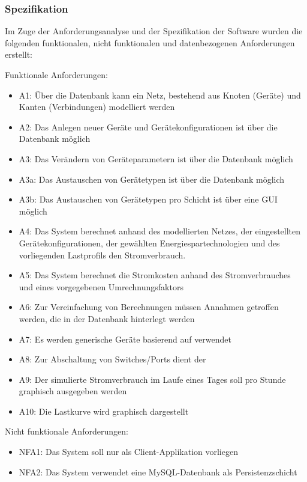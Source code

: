 \subsubsection{Spezifikation}
Im Zuge der Anforderungsanalyse und der Spezifikation der Software wurden die folgenden funktionalen, nicht funktionalen und datenbezogenen Anforderungen erstellt:



Funktionale Anforderungen:
\begin{itemize}
	\item A1: Über die Datenbank kann ein Netz, bestehend aus Knoten (Geräte) und Kanten (Verbindungen) modelliert werden
	\item A2: Das Anlegen neuer Geräte und Geräte\-konfi\-gura\-tionen ist über die Datenbank möglich
	\item A3: Das Verändern von Geräte\-parametern ist über die Datenbank möglich
	\item A3a: Das Austauschen von Geräte\-typen ist über die Datenbank möglich
	\item A3b: Das Austauschen von Geräte\-typen pro Schicht ist über eine GUI möglich                       
	\item A4: Das System berechnet anhand des modellierten Netzes, der eingestellten	Geräte\-konfi\-gura\-tionen, der gewählten Energiespartechnologien und des vorliegenden Lastprofils den Stromverbrauch.
	\item A5: Das System berechnet die Stromkosten anhand des Stromverbrauches und eines vorgegebenen Umrechnungsfaktors 
	\item A6: Zur Vereinfachung von Berechnungen müssen Annahmen getroffen werden, die in der Datenbank hinterlegt werden
	\item A7: Es werden generische Geräte basierend auf \cite{vanhsheet} verwendet
	\item A8: Zur Abschaltung von Switches/Ports dient der 
	\item A9: Der simulierte Stromverbrauch im Laufe eines Tages soll pro Stunde graphisch ausgegeben werden
	\item A10: Die Lastkurve wird graphisch dargestellt
\end{itemize}


Nicht funktionale Anforderungen:
\begin{itemize}
	\item NFA1: Das System soll nur als Client-Applikation vorliegen
	\item NFA2: Das System verwendet eine MySQL-Datenbank als Persistenzschicht
\end{itemize}


